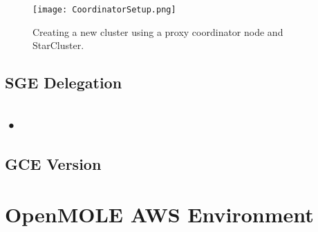 \begin{figure}[h]
	\centering
		\texttt{[image: CoordinatorSetup.png]}
	\caption{Creating a new cluster using a proxy coordinator node and StarCluster.}
	\label{CoordinatorSetup}
\end{figure}



\subsection{SGE Delegation}

\subsection{•}

\subsection{GCE Version}

\section{OpenMOLE AWS Environment}

